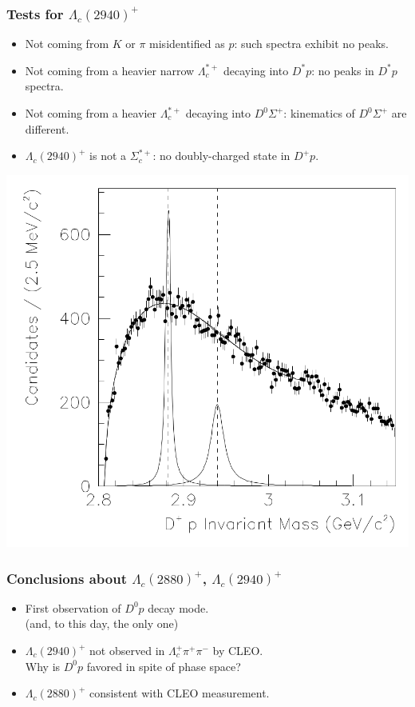 \documentclass[10pt]{beamer}
\def\Lc{{\Lambda_c^+}}
\def\Lcstar{{\Lambda_c^{*+}}{}}
\def\Lcb{{\Lambda_c(2940)^+}}
\def\LcIII{{\Lambda_c(2880)^+}}
\def\pip{{\pi^+}}
\def\pim{{\pi^-}}
\def\Dz{{D^0}}
\def\Dp{{D^+}}
\begin{document}
\begin{frame}[label=babar-tests]%
  \frametitle{Tests for $\Lcb$}
  \centering
  \parbox{.48\linewidth}{
    \begin{itemize}
      \item Not coming from $K$ or $\pi$ misidentified as $p$:
        such spectra exhibit no peaks.
      \item Not coming from a heavier narrow $\Lcstar$
        decaying into $D^* p$:
        no peaks in $D^* p$ spectra.
      \item Not coming from a heavier $\Lcstar$
        decaying into $D^0 \Sigma^+$:
        kinematics of $D^0 \Sigma^+$ are different.
      \item $\Lcb$ is not a $\Sigma_c^{*+}$:
        no doubly-charged state in $\Dp p$.
    \end{itemize}
  } \parbox{.5\linewidth}{
    \includegraphics[width=\linewidth]{figures/004/babar-fig003}
  }
\end{frame}%

\begin{frame}[label=babar-conclusion]%
  \frametitle{Conclusions about $\LcIII$, $\Lcb$}
  \Large
  \begin{itemize}
    \item First observation of $\Dz p$ decay mode.
      \\ (and, to this day, the only one)
    \item $\Lcb$ not observed in $\Lc\pip\pim$ by CLEO.
      \\ Why is $\Dz p$ favored in spite of phase space?
    \item $\LcIII$ consistent with CLEO measurement.
  \end{itemize}
\end{frame}%
\end{document}
